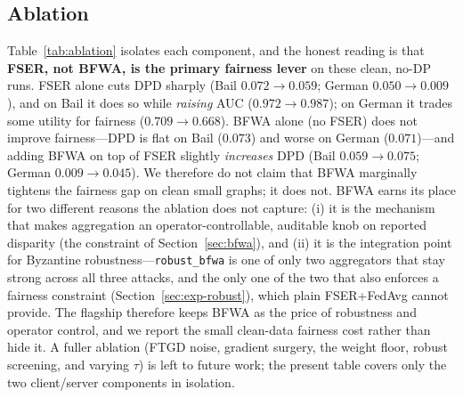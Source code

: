 \documentclass[pdflatex,sn-mathphys-num]{sn-jnl}
\theoremstyle{thmstyleone}%
\theoremstyle{thmstyletwo}%
\theoremstyle{thmstylethree}%
\begin{document}
\begin{table}[t]\centering\small
\caption{Utility (AUC-ROC, higher is better). Mean\,$\pm$\,std over seeds:
\textbf{10} on the small/high-variance German, \textbf{5} on Bail and Pokec, and
2--3 on the larger Credit/Elliptic (see Table~\ref{tab:significance} for paired
tests). Best per column in bold. TrustFedGNN is the only method that is
fair \emph{and} private (methods above the rule are non-private).
$^{\ast}$FaVGNN is a horizontal adaptation of a vertical-FL method.
FairGFL/FedGraph-Fair/PUFFLE/FedFACT/PoPETs'25 are 2025--2026 reimplementations
with approximated fidelity (Appendix~\ref{app:baselines}).}
\label{tab:main-auc}
{\footnotesize\setlength{\tabcolsep}{3pt}}
\end{table}

\begin{table}[t]\centering\small
\caption{Demographic Parity Difference (DPD, lower is fairer).}
\label{tab:main-dpd}
{\footnotesize\setlength{\tabcolsep}{3pt}}
\end{table}

\begin{table}[t]\centering\small
\caption{Equal Opportunity Difference (EOD, lower is fairer).}
\label{tab:main-eod}
{\footnotesize\setlength{\tabcolsep}{3pt}}
\end{table}

\subsection{Ablation}
\label{sec:exp-ablation}
Table~\ref{tab:ablation} isolates each component, and the honest reading is that
\textbf{FSER, not BFWA, is the primary fairness lever} on these clean, no-DP
runs. FSER alone cuts DPD sharply (Bail $0.072\!\to\!0.059$; German
$0.050\!\to\!0.009$), and on Bail it does so while \emph{raising} AUC
($0.972\!\to\!0.987$); on German it trades some utility for fairness
($0.709\!\to\!0.668$). BFWA alone (no FSER) does not improve fairness---DPD is
flat on Bail ($0.073$) and worse on German ($0.071$)---and adding BFWA on top of
FSER slightly \emph{increases} DPD (Bail $0.059\!\to\!0.075$; German
$0.009\!\to\!0.045$). We therefore do not claim that BFWA marginally tightens the
fairness gap on clean small graphs; it does not. BFWA earns its place for two
different reasons the ablation does not capture: (i) it is the mechanism that
makes aggregation an operator-controllable, auditable knob on reported disparity
(the constraint of Section~\ref{sec:bfwa}), and (ii) it is the integration point
for Byzantine robustness---\texttt{robust\_bfwa} is one of only two aggregators
that stay strong across all three attacks, and the only one of the two that also
enforces a fairness constraint (Section~\ref{sec:exp-robust}), which plain
FSER+FedAvg cannot provide. The flagship therefore keeps BFWA as the price of
robustness and operator control, and we report the small clean-data fairness cost
rather than hide it. A fuller ablation (FTGD noise, gradient surgery, the weight
floor, robust screening, and varying $\tau$) is left to future work; the present
table covers only the two client/server components in isolation.
\end{document}
